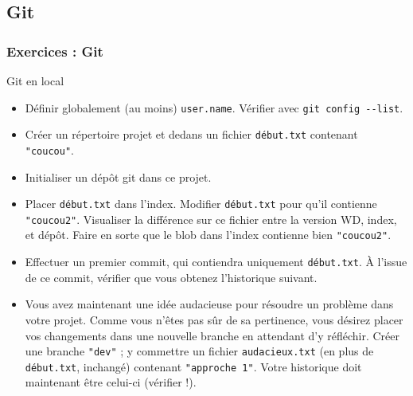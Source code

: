 \documentclass[english, french]{beamer}
\begin{document}
\subsection{Git}
\begin{frame}[allowframebreaks]
	\small
	\frametitle{Exercices : Git}
	Git en local
	\begin{itemize}
		\item Définir globalement (au moins) \texttt{user.name}. Vérifier avec \texttt{git config -{}-list}.
		\item Créer un répertoire projet et dedans un fichier \texttt{début.txt} contenant \texttt{"coucou"}.
		\item Initialiser un dépôt git dans ce projet.
		\item Placer \texttt{début.txt} dans l’index. Modifier \texttt{début.txt} pour qu’il contienne \texttt{"coucou2"}. Visualiser la différence sur ce fichier entre la version WD, index, et dépôt. Faire en sorte que le blob dans l’index contienne bien \texttt{"coucou2"}.
		\item Effectuer un premier commit, qui contiendra uniquement \texttt{début.txt}. À l’issue de ce commit, vérifier que vous obtenez l’historique suivant.\par
		{
			\centering
			\par
		}
		\item Vous avez maintenant une idée audacieuse pour résoudre un problème dans votre projet. Comme vous n’êtes pas sûr de sa pertinence, vous désirez placer vos changements dans une nouvelle branche en attendant d’y réfléchir. Créer une branche \texttt{"dev"} ; y commettre un fichier \texttt{audacieux.txt} (en plus de \texttt{début.txt}, inchangé) contenant \texttt{"approche 1"}. Votre historique doit maintenant être celui-ci (vérifier !).\par
		{
			\centering
			}
\end{itemize}
\end{frame}
\end{document}
